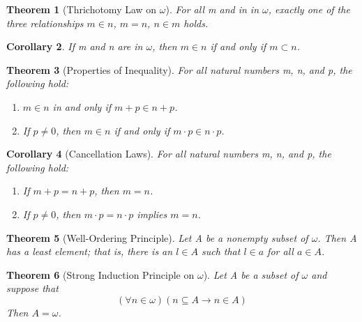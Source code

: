 \documentclass[letterpaper, 10pt]{article}
\newtheorem{thm}{Theorem}[section]
\numberwithin{thm}{subsection}
\newtheorem{col}[thm]{Corollary}
\theoremstyle{definition}
\begin{document}
\begin{thm}[Thrichotomy Law on $\omega$]
	For all m and in in $\omega$, exactly one of the three relationships $m \in n$, $m=n$, $n\in m$ holds.
\end{thm}

\begin{col}
	If m and n are in $\omega$, then $m \in n$ if and only if $m \subset n$.
\end{col}

\begin{thm}[Properties of Inequality]
	For all natural numbers m, n, and p, the following hold:
	\begin{enumerate}[label=(\arabic*)]
		\item $m \in n$ in and only if $m+p \in n+p$.
		\item If $p \ne 0$, then $m \in n$ if and only if $m\cdot p \in n \cdot p$.
	\end{enumerate}
\end{thm}
	
\begin{col}[Cancellation Laws]
	For all natural numbers m, n, and p, the following hold:
	\begin{enumerate}[label=(\arabic*)]
		\item If $m+p = n+p$, then $m=n$.
		\item If $p \ne 0$, then $m \cdot p = n \cdot p$ implies $m=n$.
	\end{enumerate}
\end{col}

\begin{thm}[Well-Ordering Principle]
	Let A be a nonempty subset of $\omega$. Then A has a least element; that is, there is an $l \in A$ such 
	that $l \in a$ for all $a \in A$.
\end{thm}

\begin{thm}[Strong Induction Principle on $\omega$]
	Let A be a subset of $\omega$ and suppose that
	\begin{equation}
		(\forall n \in \omega)(n \subseteq A \to n \in A)
	\end{equation}
	Then $A=\omega$.
\end{thm}
\end{document}

